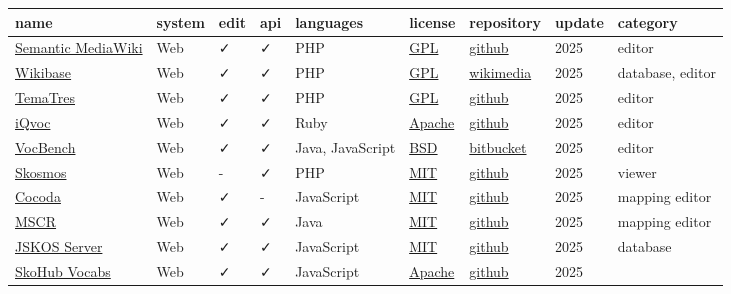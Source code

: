 \documentclass[
  DIV=10]{article}
\begin{document}
\begin{longtable}[]{@{}lllllllll@{}}
\toprule\noalign{}
name & system & edit & api & languages & license & repository & update &
category \\
\midrule\noalign{}
\endhead
\bottomrule\noalign{}
\endlastfoot
\href{https://www.semantic-mediawiki.org/}{Semantic MediaWiki} & Web & ✓
& ✓ & PHP & \href{https://spdx.org/licenses/GPL-3.0-or-later}{GPL} &
\href{https://github.com/SemanticMediaWiki/SemanticMediaWiki/}{github} &
2025 & editor \\
\href{http://wikiba.se/}{Wikibase} & Web & ✓ & ✓ & PHP &
\href{https://spdx.org/licenses/GPL-3.0-or-later}{GPL} &
\href{https://gerrit.wikimedia.org/g/mediawiki/extensions/Wikibase}{wikimedia}
& 2025 & database, editor \\
\href{https://vocabularyserver.com/web/}{TemaTres} & Web & ✓ & ✓ & PHP &
\href{https://spdx.org/licenses/GPL-3.0-or-later}{GPL} &
\href{https://github.com/tematres/TemaTres-Vocabulary-Server}{github} &
2025 & editor \\
\href{https://iqvoc.net/}{iQvoc} & Web & ✓ & ✓ & Ruby &
\href{https://spdx.org/licenses/Apache-2.0}{Apache} &
\href{https://github.com/innoq/iqvoc}{github} & 2025 & editor \\
\href{https://vocbench.uniroma2.it/}{VocBench} & Web & ✓ & ✓ & Java,
JavaScript & \href{https://spdx.org/licenses/BSD-3-Clause}{BSD} &
\href{https://bitbucket.org/art-uniroma2/vocbench3/src/master/}{bitbucket}
& 2025 & editor \\
\href{https://skosmos.org/}{Skosmos} & Web & - & ✓ & PHP &
\href{https://spdx.org/licenses/MIT}{MIT} &
\href{https://github.com/NatLibFi/Skosmos}{github} & 2025 & viewer \\
\href{https://coli-conc.gbv.de/cocoda/}{Cocoda} & Web & ✓ & - &
JavaScript & \href{https://spdx.org/licenses/MIT}{MIT} &
\href{https://github.com/gbv/cocoda}{github} & 2025 & mapping editor \\
\href{https://cscfi.github.io/mscr-docs/}{MSCR} & Web & ✓ & ✓ & Java &
\href{https://spdx.org/licenses/MIT}{MIT} &
\href{https://github.com/CSCfi/mscr-compose}{github} & 2025 & mapping
editor \\
\href{https://github.com/gbv/jskos-server}{JSKOS Server} & Web & ✓ & ✓ &
JavaScript & \href{https://spdx.org/licenses/MIT}{MIT} &
\href{https://github.com/gbv/jskos-server}{github} & 2025 & database \\
\href{https://github.com/skohub-io/skohub-vocabs}{SkoHub Vocabs} & Web &
✓ & ✓ & JavaScript & \href{https://spdx.org/licenses/Apache-2.0}{Apache}
& \href{https://github.com/skohub-io/skohub-vocabs}{github} & 2025 &

\end{longtable}
\end{document}
